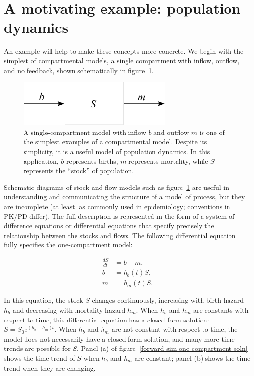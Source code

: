 \section{A motivating example: population dynamics}

An example will help to make these concepts more concrete.  We begin
with the simplest of compartmental models, a single compartment with
inflow, outflow, and no feedback, shown schematically in
figure~\ref{forward-sim-one-compartment}.

\begin{figure}[h]
\begin{center}
\includegraphics[width=3in]{S.pdf}
\caption[A single-compartment model with inflow $b$ and outflow $m$.]{A 
  single-compartment model with inflow $b$ and outflow $m$
  is one of the simplest examples of a compartmental model. Despite
  its simplicity, it is a useful model of population dynamics.  In
  this application, $b$ represents births, $m$ represents
  mortality, while $S$ represents the ``stock'' of
  population.}
\label{forward-sim-one-compartment}
\end{center}
\end{figure}


Schematic diagrams of stock-and-flow models such as
figure~\ref{forward-sim-one-compartment} are useful in understanding
and communicating the structure of a model of process, but they are
incomplete (at least, as commonly used in epidemiology; conventions in
PK/PD differ). The full description is represented in the form of a
system of difference equations or differential equations that specify
precisely the relationship between the stocks and flows. The following
differential equation fully specifies the one-compartment model:

\begin{align*}
\frac{dS}{dt}&= b - m,\\
b&=h_b(t) S,\\
m&=h_m(t) S.
\end{align*}

In this equation, the stock $S$ changes continuously, increasing with
birth hazard $h_b$ and decreasing with mortality hazard $h_m$. When
$h_b$ and $h_m$ are constants with respect to time, this differential
equation has a closed-form solution: $S = S_0 e^{(h_b-h_m)t}$. When
$h_b$ and $h_m$ are not constant with respect to time, the model does
not necessarily have a closed-form solution, and many more time trends
are possible for $S$.  Panel (a) of figure~\ref{forward-sim-one-compartment-soln}
shows the time trend of $S$ when $h_b$ and $h_m$ are constant; panel
(b) shows the time trend when they are changing.

